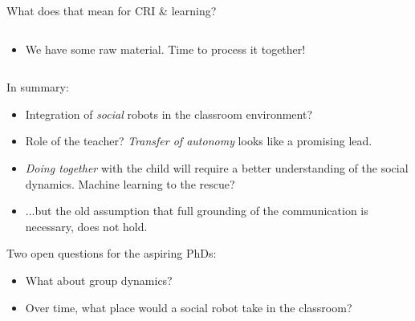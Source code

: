 \documentclass[xcolor=table]{beamer}
\begin{document}
\begin{frame}{What does that mean for CRI \& learning?}
\begin{columns}
\begin{column}{0.6\linewidth}
{\begin{itemize}
                    real-time!)
                \item<+-> We have some raw material. Time to
                    process it together!
            \end{itemize}
        }
%
        \end{column}
    \end{columns}
\end{frame}


{
\begin{frame}[plain]

    {\Large In summary:}

    \begin{itemize}
        \item<+-> Integration of \emph{social} robots in the classroom environment?
        \item<+-> Role of the teacher? \emph{Transfer of autonomy} looks like a
            promising lead.
        \item<+-> \emph{Doing together} with the child will require a better
            understanding of the social dynamics. Machine learning to the
            rescue?
        \item<+-> ...but the old assumption that full grounding of the
            communication is necessary, does not hold.
    \end{itemize}
\end{frame}
}


{
\begin{frame}[plain]

    {\Large Two open questions for the aspiring PhDs:}

    \begin{itemize}
        \item<+-> What about group dynamics?
        \item<+-> Over time, what place would a social robot take in the
            classroom?
    \end{itemize}
\end{frame}
}
\end{document}

